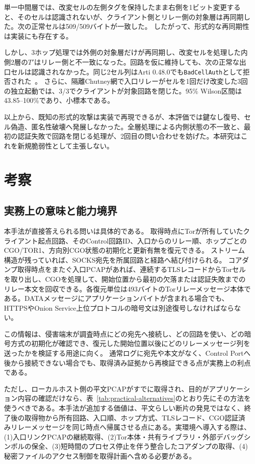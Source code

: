\documentclass[10pt,a4paper]{ltjsarticle}
\newcommand{\code}[1]{\nolinkurl{#1}}
\newcommand{\torone}{\textsc{TOR1}}
\begin{document}
単一中間層では、改変セルの左側タグを保持したまま右側を1ビット変更すると、そのセルは認識されないが、クライアント側とリレー側の対象層は再同期した。次の正常セルは509/509バイトが一致した。
したがって、形式的な再同期性は実装にも存在する。

しかし、3ホップ処理では外側の対象層だけが再同期し、改変セルを処理した内側2層の$T'$はリレー側と不一致になった。回路を仮に維持しても、次の正常な出口セルは認識されなかった。同じ2セル列はArti 0.48.0でも\code{BadCellAuth}として拒否された~\cite{artisource048}。
さらに、隔離Chutney網で入口リレーがセルを1回だけ改変した3回の独立起動では、3/3でクライアントが対象回路を閉じた。95\% Wilson区間は43.85--100\%であり、小標本である。

以上から、既知の形式的攻撃は実装で再現できるが、本評価では鍵なし復号、セル偽造、匿名性破壊へ発展しなかった。全層処理による内側状態の不一致と、最初の認証失敗で回路を閉じる処理が、2回目の問い合わせを妨げた。本研究はこれを新規脆弱性として主張しない。

\section{考察}\label{sec:discussion}

\subsection{実務上の意味と能力境界}

本手法が直接答えられる問いは具体的である。
取得時点にTorが所有していたクライアント起点回路、そのControl回路ID、入口からのリレー順、ホップごとのCGO/\torone{}、方向別CGO状態の初期化と更新有無を復元できる。
ストリーム構造が残っていれば、SOCKS宛先を所属回路と経路へ結び付けられる。
コアダンプ取得時点をまたぐ入口PCAPがあれば、連続するTLSレコードからTorセルを取り出し、CGOを処理して、開始位置から最初の欠落または認証失敗までのリレー本文を回収できる。各復元単位は493バイトのTorリレーメッセージ本体である。DATAメッセージにアプリケーションバイトが含まれる場合でも、HTTPSやOnion Service上位プロトコルの暗号文は別途復号しなければならない。

この情報は、侵害端末が調査時点にどの宛先へ接続し、どの回路を使い、どの暗号方式の初期化が確認でき、復元した開始位置以後にどのリレーメッセージ列を送ったかを検証する用途に向く。
通常ログに宛先や本文がなく、Control Portへ後から接続できない場合でも、取得済み証拠から再検証できる点が実務上の利点である。

ただし、ローカルホスト側の平文PCAPがすでに取得され、目的がアプリケーション内容の確認だけなら、表~\ref{tab:practical-alternatives}のとおり先にその方法を使うべきである。本手法が追加する価値は、平文らしい断片の発見ではなく、終了後の取得物から所有回路、入口順、ホップ方式、TLSレコード、CGO認証済みリレーメッセージを同じ時点へ帰属させる点にある。実環境へ導入する際は、(1)入口リンクPCAPの継続取得、(2)Tor本体・共有ライブラリ・外部デバッグシンボルの保全、(3)短時間のプロセス停止を伴う整合したコアダンプの取得、(4)秘密ファイルのアクセス制御を取得計画へ含める必要がある。
\end{document}
